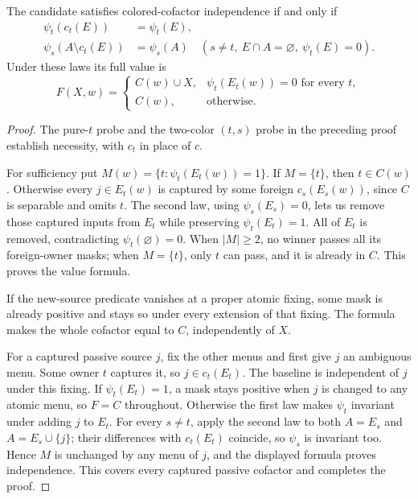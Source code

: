 \begin{lemma}
\label{core:lem:terminal-closure-laws}
The candidate satisfies colored-cofactor independence if and only if
\begin{align*}
 \psi_t(c_t(E))&=\psi_t(E),\\
 \psi_s(A\setminus c_t(E))&=\psi_s(A)
 \quad(s\ne t,\ E\cap A=\varnothing,\ \psi_t(E)=0).
\end{align*}
Under these laws its full value is
\[
 F(X,w)=\begin{cases}
 C(w)\cup X,&\psi_t(E_t(w))=0\text{ for every }t,\\
 C(w),&\text{otherwise}.
 \end{cases}
\]
\end{lemma}
\begin{proof}
The pure-$t$ probe and the two-color $(t,s)$ probe in the preceding
proof establish necessity, with $c_t$ in place of $c$.

For sufficiency put $M(w)=\{t:\psi_t(E_t(w))=1\}$.
If $M=\{t\}$, then $t\in C(w)$. Otherwise every $j\in E_t(w)$
is captured by some foreign $c_s(E_s(w))$, since $C$ is separable
and omits $t$. The second law, using $\psi_s(E_s)=0$, lets us
remove those captured inputs from $E_t$ while preserving
$\psi_t(E_t)=1$. All of $E_t$ is removed, contradicting
$\psi_t(\varnothing)=0$.
When $|M|\geq2$, no winner passes all its foreign-owner masks;
when $M=\{t\}$, only $t$ can pass, and it is already in $C$.
This proves the value formula.

If the new-source predicate vanishes at a proper atomic fixing, some
mask is already positive and stays so under every extension of that
fixing. The formula makes the whole cofactor equal to $C$, independently
of $X$.

For a captured passive source $j$, fix the other menus and first give
$j$ an ambiguous menu. Some owner $t$ captures it, so
$j\in c_t(E_t)$. The baseline is independent of $j$ under this fixing.
If $\psi_t(E_t)=1$, a mask stays positive when $j$ is changed to any
atomic menu, so $F=C$ throughout. Otherwise the first law makes
$\psi_t$ invariant under adding $j$ to $E_t$. For every $s\ne t$,
apply the second law to both $A=E_s$ and $A=E_s\cup\{j\}$;
their differences with $c_t(E_t)$ coincide, so $\psi_s$ is invariant
too. Hence $M$ is unchanged by any menu of $j$, and the displayed
formula proves independence. This covers every captured passive
cofactor and completes the proof.
\end{proof}

